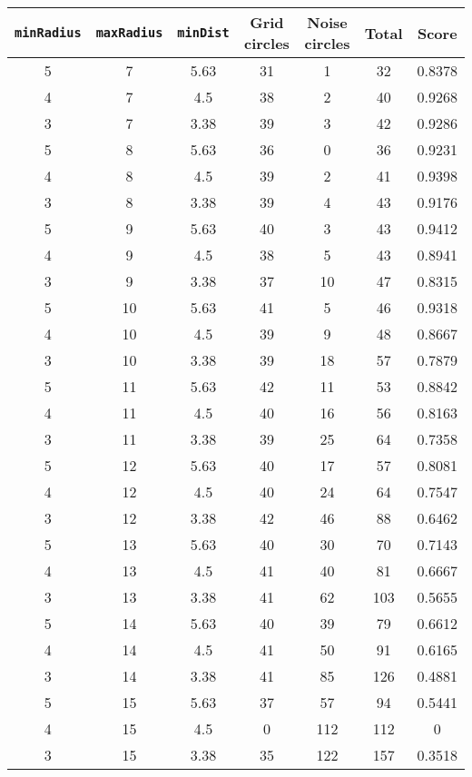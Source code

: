 \documentclass[letterpaper, 12pt]{article}
\begin{document}
\begin{longtable}{|c|c|c|c|c|c|c|}
\hline
\textbf{\texttt{minRadius}} & \textbf{\texttt{maxRadius}} & \textbf{\texttt{minDist}} & \textbf{Grid circles} & \textbf{Noise circles} & \textbf{Total} & \textbf{Score} \\
\hline
5 & 7 & 5.63 & 31 & 1 & 32 & 0.8378 \\
\hline
4 & 7 & 4.5 & 38 & 2 & 40 & 0.9268 \\
\hline
3 & 7 & 3.38 & 39 & 3 & 42 & 0.9286 \\
\hline
5 & 8 & 5.63 & 36 & 0 & 36 & 0.9231 \\
\hline
4 & 8 & 4.5 & 39 & 2 & 41 & 0.9398 \\
\hline
3 & 8 & 3.38 & 39 & 4 & 43 & 0.9176 \\
\hline
5 & 9 & 5.63 & 40 & 3 & 43 & 0.9412 \\
\hline
4 & 9 & 4.5 & 38 & 5 & 43 & 0.8941 \\
\hline
3 & 9 & 3.38 & 37 & 10 & 47 & 0.8315 \\
\hline
5 & 10 & 5.63 & 41 & 5 & 46 & 0.9318 \\
\hline
4 & 10 & 4.5 & 39 & 9 & 48 & 0.8667 \\
\hline
3 & 10 & 3.38 & 39 & 18 & 57 & 0.7879 \\
\hline
5 & 11 & 5.63 & 42 & 11 & 53 & 0.8842 \\
\hline
4 & 11 & 4.5 & 40 & 16 & 56 & 0.8163 \\
\hline
3 & 11 & 3.38 & 39 & 25 & 64 & 0.7358 \\
\hline
5 & 12 & 5.63 & 40 & 17 & 57 & 0.8081 \\
\hline
4 & 12 & 4.5 & 40 & 24 & 64 & 0.7547 \\
\hline
3 & 12 & 3.38 & 42 & 46 & 88 & 0.6462 \\
\hline
5 & 13 & 5.63 & 40 & 30 & 70 & 0.7143 \\
\hline
4 & 13 & 4.5 & 41 & 40 & 81 & 0.6667 \\
\hline
3 & 13 & 3.38 & 41 & 62 & 103 & 0.5655 \\
\hline
5 & 14 & 5.63 & 40 & 39 & 79 & 0.6612 \\
\hline
4 & 14 & 4.5 & 41 & 50 & 91 & 0.6165 \\
\hline
3 & 14 & 3.38 & 41 & 85 & 126 & 0.4881 \\
\hline
5 & 15 & 5.63 & 37 & 57 & 94 & 0.5441 \\
\hline
4 & 15 & 4.5 & 0 & 112 & 112 & 0 \\
\hline
3 & 15 & 3.38 & 35 & 122 & 157 & 0.3518 \\

\end{longtable}
\end{document}
